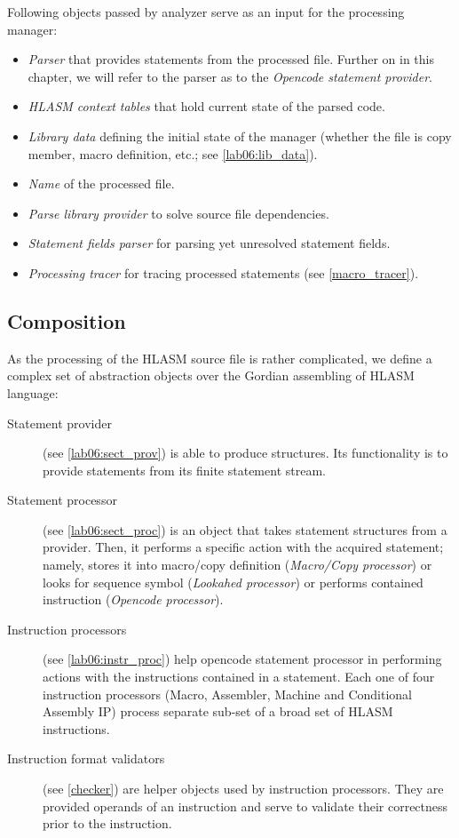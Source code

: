 Following objects passed by analyzer serve as an input for the processing manager:
\begin{itemize}
	\item \emph{Parser} that provides statements from the processed file. Further on in this chapter, we will refer to the parser as to the \emph{Opencode statement provider}.
	\item \emph{HLASM context tables} that hold current state of the parsed code.
	\item \emph{Library data} defining the initial state of the manager (whether the file is copy member, macro definition, etc.; see \cref{lab06:lib_data}). 
	\item \emph{Name} of the processed file.
	\item \emph{Parse library provider} to solve source file dependencies.
	\item \emph{Statement fields parser} for parsing yet unresolved statement fields. 
	\item \emph{Processing tracer} for tracing processed statements (see \cref{macro_tracer}).
\end{itemize}


\subsection{Composition}

As the processing of the HLASM source file is rather complicated, we define a complex set of abstraction objects over the Gordian assembling of HLASM language:

\begin{description}
	\item[Statement provider] (see \cref{lab06:sect_prov}) is able to produce  structures. Its functionality is to provide statements from its finite statement stream.
	
	\item[Statement processor] (see \cref{lab06:sect_proc}) is an object that takes statement structures from a provider. Then, it performs a specific action with the acquired statement; namely, stores it into macro/copy definition (\emph{Macro/Copy processor}) or looks for sequence symbol (\emph{Lookahed processor}) or performs contained instruction (\emph{Opencode processor}).
	
	\item[Instruction processors] (see \cref{lab06:instr_proc}) help opencode statement processor in performing actions with the instructions contained in a statement. Each one of four instruction processors (Macro, Assembler, Machine and Conditional Assembly IP) process separate sub-set of a broad set of HLASM instructions. 
	
	\item[Instruction format validators] (see \cref{checker}) are helper objects used by instruction processors. They are provided operands of an instruction and serve to validate their correctness prior to the instruction. 
	
\end{description}


